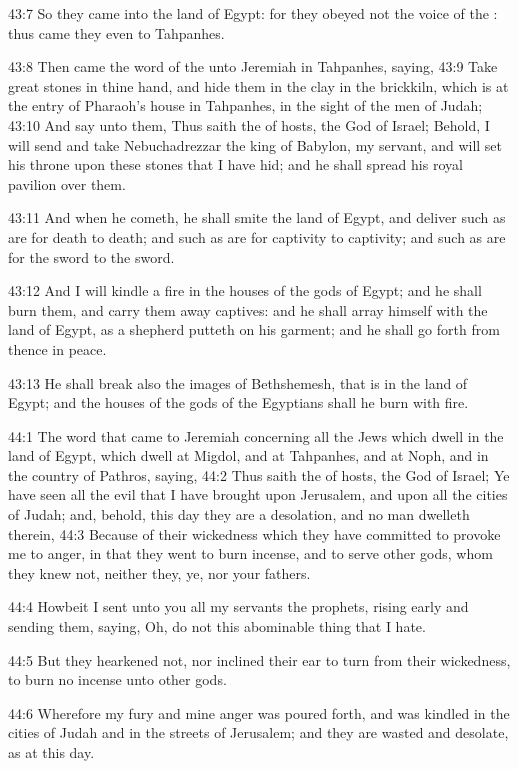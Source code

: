 43:7 So they came into the land of Egypt: for they obeyed not the voice of the \LORD: thus came they even to Tahpanhes.

43:8 Then came the word of the \LORD unto Jeremiah in Tahpanhes, saying, 43:9 Take great stones in thine hand, and hide them in the clay in the brickkiln, which is at the entry of Pharaoh's house in Tahpanhes, in the sight of the men of Judah; 43:10 And say unto them, Thus saith the \LORD of hosts, the God of Israel; Behold, I will send and take Nebuchadrezzar the king of Babylon, my servant, and will set his throne upon these stones that I have hid; and he shall spread his royal pavilion over them.

43:11 And when he cometh, he shall smite the land of Egypt, and deliver such as are for death to death; and such as are for captivity to captivity; and such as are for the sword to the sword.

43:12 And I will kindle a fire in the houses of the gods of Egypt; and he shall burn them, and carry them away captives: and he shall array himself with the land of Egypt, as a shepherd putteth on his garment; and he shall go forth from thence in peace.

43:13 He shall break also the images of Bethshemesh, that is in the land of Egypt; and the houses of the gods of the Egyptians shall he burn with fire.

44:1 The word that came to Jeremiah concerning all the Jews which dwell in the land of Egypt, which dwell at Migdol, and at Tahpanhes, and at Noph, and in the country of Pathros, saying, 44:2 Thus saith the \LORD of hosts, the God of Israel; Ye have seen all the evil that I have brought upon Jerusalem, and upon all the cities of Judah; and, behold, this day they are a desolation, and no man dwelleth therein, 44:3 Because of their wickedness which they have committed to provoke me to anger, in that they went to burn incense, and to serve other gods, whom they knew not, neither they, ye, nor your fathers.

44:4 Howbeit I sent unto you all my servants the prophets, rising early and sending them, saying, Oh, do not this abominable thing that I hate.

44:5 But they hearkened not, nor inclined their ear to turn from their wickedness, to burn no incense unto other gods.

44:6 Wherefore my fury and mine anger was poured forth, and was kindled in the cities of Judah and in the streets of Jerusalem; and they are wasted and desolate, as at this day.

